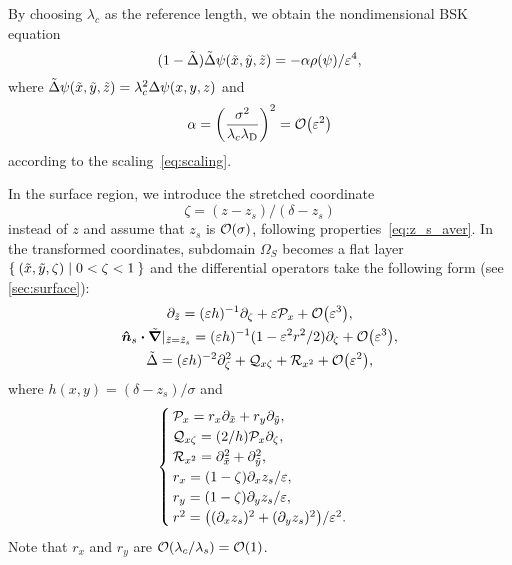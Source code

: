 By choosing $\lambda_c$ as the reference length, we obtain the nondimensional BSK equation
\begin{equation}\label{eq:BSKtilde}
    (1-\tilde\Delta)\tilde\Delta\psi(\tilde{x},\tilde{y},\tilde{z}) = -\alpha\rho(\psi)/\varepsilon^4,
\end{equation}
where $\tilde\Delta\psi(\tilde{x},\tilde{y},\tilde{z}) = \lambda_c^2\Delta\psi(x,y,z)$ and
\begin{equation}\label{eq:alpha}
    \alpha = \qty(\frac{\sigma^2}{\lambda_c\lambdaD})^2 = \order{\eps^2}
\end{equation}
according to the scaling~\eqref{eq:scaling}.

In the surface region, we introduce the stretched coordinate
\begin{equation}\label{eq:zeta}
    \zeta = (z-z_s)/(\delta-z_s)
\end{equation}
instead of $z$ and assume that $z_s$ is $\order{\sigma}$, following properties~\eqref{eq:z_s_aver}. In the transformed coordinates, subdomain $\Omega_S$ becomes a flat layer $\Set{(\tilde{x},\tilde{y},\zeta) | 0<\zeta<1}$ and the differential operators take the following form (see \cref{sec:surface}):
\begin{gather}
    \ptz = (\eps h)^{-1}\pzeta + \eps \mathcal{P}_x + \order{\eps^3}, \label{eq:ptz_zeta}\\
    \bn_s\vdot\tgrad|_{\tz=\tz_s} = (\eps h)^{-1}(1-\eps^2r^2/2)\pzeta + \order{\eps^3}, \label{eq:ngrad_zeta}\\
    \tD = (\eps h)^{-2}\pzeta^2 + \mathcal{Q}_{x\zeta} + \mathcal{R}_{x^2} + \order{\eps^2}, \label{eq:laplacian_zeta}
\end{gather}
where $h(x,y)=(\delta-z_s)/\sigma$ and
\begin{equation}\label{eq:PQRrxy}
    \begin{cases}
        \mathcal{P}_x = r_x\partial_{\tilde{x}} + r_y\partial_{\tilde{y}}, \\
        \mathcal{Q}_{x\zeta} = (2/h)\mathcal{P}_x\partial_\zeta, \\
        \mathcal{R}_{x^2} = \partial_{\tilde{x}}^2 + \partial_{\tilde{y}}^2, \\
        r_x = (1-\zeta)\partial_x z_s/\varepsilon, \\
        r_y = (1-\zeta)\partial_y z_s/\varepsilon, \\
        r^2 = \qty((\partial_x z_s)^2 + (\partial_y z_s)^2)/\varepsilon^2.
    \end{cases}
\end{equation}
Note that $r_x$ and $r_y$ are $\order{\lambda_c/\lambda_s} = \order{1}$.

